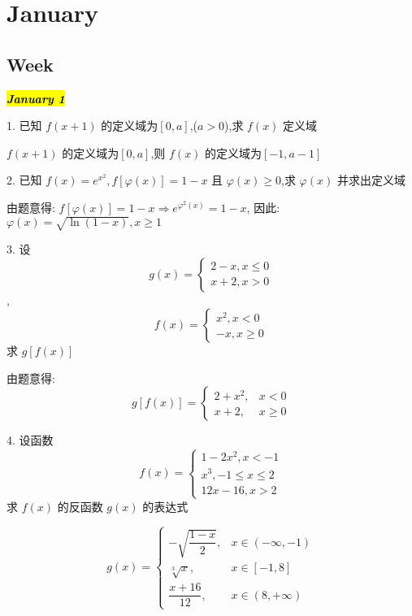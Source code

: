 \chapter{January}
\section{Week }

\hl{\textbf{\textit{January 1}}}

1. 已知 $f(x+1)$ 的定义域为$[0,a]$,($a>0$),求 $f(x)$ 定义域
\begin{solution}
	
	$f(x+1)$ 的定义域为$[0,a]$,则 $f(x)$ 的定义域为$[-1,a-1]$
\end{solution}

2. 已知 $f(x)=e^{x^{2}},f[\varphi(x)]=1-x$ 且 $\varphi(x)\geq 0$,求 $\varphi(x)$ 并求出定义域
\begin{solution}
	
	由题意得: $f[\varphi(x)]=1-x\Rightarrow e^{\varphi^{2}(x)}=1-x$, 因此: $\varphi(x)=\sqrt{\ln (1-x)}, x\ge 1$
\end{solution}

3. 设 
	$$g(x)=
	\begin{cases}
		2-x,x\leq 0\\ x+2,x>0
	\end{cases}$$,$$f(x)=
	\begin{cases}
		x^{2},x< 0\\ -x,x\geq 0
	\end{cases}
	$$
求 $g[f(x)]$
\begin{solution}

	由题意得:
	$$
	g[f(x)] = 
	\begin{cases}
		2+x^{2}, & x<0\\
		x+2, & x\geq 0
	\end{cases}
	$$
\end{solution}

4. 设函数 $$f(x)=
\begin{cases}
	1-2x^{2},x<-1\\
	x^{3},-1\leq x\leq 2\\
	12x-16,x>2
\end{cases}
$$
求 $f(x)$ 的反函数 $g(x)$ 的表达式
\begin{solution}
	$$
	g(x) = 
	\begin{cases}
		-\sqrt{\dfrac{1-x}{2}}, & x\in(-\infty,-1)\\
		\displaystyle{\sqrt[3]{x}}, & x\in[-1,8]\\
		\dfrac{x+16}{12}, & x\in(8,+\infty)
	\end{cases}
	$$
\end{solution}

